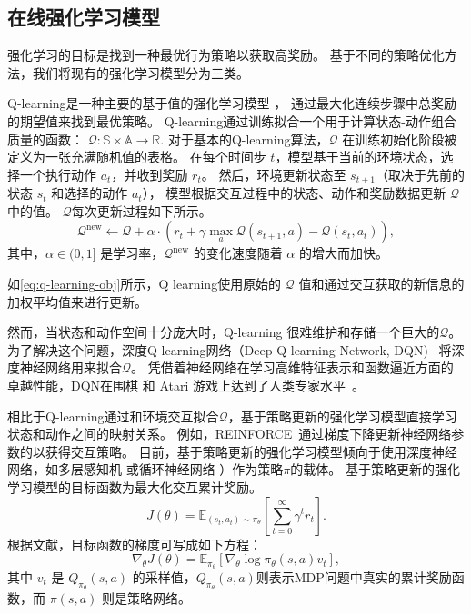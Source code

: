 \subsection{在线强化学习模型}
\label{sec:Deep Reinforcement Learning model}
强化学习的目标是找到一种最优行为策略以获取高奖励。
基于不同的策略优化方法，我们将现有的强化学习模型分为三类。

Q-learning是一种主要的基于值的强化学习模型 \cite{watkins1989learning}，
通过最大化连续步骤中总奖励的期望值来找到最优策略。
Q-learning通过训练拟合一个用于计算状态-动作组合质量的函数：
$
\mathcal{Q}: \mathbb{S} \times \mathbb{A} \rightarrow \mathbb{R}.
$
对于基本的Q-learning算法，$\mathcal{Q}$ 在训练初始化阶段被定义为一张充满随机值的表格。
在每个时间步 $t$，模型基于当前的环境状态，选择一个执行动作 $a_t$，并收到奖励 $r_t$。
然后，环境更新状态至 $s_{t+1}$（取决于先前的状态 $s_t$ 和选择的动作 $a_t$），
模型根据交互过程中的状态、动作和奖励数据更新 $\mathcal{Q}$ 中的值。
$\mathcal{Q}$每次更新过程如下所示。
\begin{equation}
    \label{eq:q-learning-obj}
    \mathcal{Q}^{\text{new}} \leftarrow \mathcal{Q} + 
    \alpha \cdot\left(r_{t}+\gamma \max_{a} \mathcal{Q}\left(s_{t+1}, a\right)-\mathcal{Q}\left(s_{t}, a_{t}\right)\right), 
\end{equation}
其中，$\alpha \in (0,1]$ 是学习率，$\mathcal{Q}^{\text{new}}$ 的变化速度随着 $\alpha$ 的增大而加快。

如\autoref{eq:q-learning-obj}所示，Q learning使用原始的 $\mathcal{Q}$ 值和通过交互获取的新信息的加权平均值来进行更新。

然而，当状态和动作空间十分庞大时，Q-learning 很难维护和存储一个巨大的$\mathcal{Q}$。
为了解决这个问题，深度Q-learning网络（Deep Q-learning Network, DQN)~\cite{MKSGAWR13} 将深度神经网络用来拟合$\mathcal{Q}$。
凭借着神经网络在学习高维特征表示和函数逼近方面的卓越性能，DQN在围棋 \cite{SSSAHGHBLB17} 和 Atari 游戏上达到了人类专家水平~\cite{MKSGAWR13}。

相比于Q-learning通过和环境交互拟合$\mathcal{Q}$，基于策略更新的强化学习模型直接学习状态和动作之间的映射关系。
例如，REINFORCE~\cite{W92}通过梯度下降更新神经网络参数的以获得交互策略。
目前，基于策略更新的强化学习模型倾向于使用深度神经网络，如多层感知机 \cite{XLZP18} 或循环神经网络 \cite{ZMFLA16}）作为策略$\pi$的载体。
基于策略更新的强化学习模型的目标函数为最大化交互累计奖励。
\begin{equation}
    \label{eq:pg-obj}
    J(\theta)=\mathbb{E}_{\left(s_{t}, a_{t}\right) \sim \pi_{\theta}}\left[\sum_{t=0}^{\infty} \gamma^{t} r_{t}\right]. 
\end{equation}
根据文献{\rm\parencite{KT99}}，目标函数的梯度可写成如下方程：
\begin{equation}
    \nabla_{\theta} J(\theta)=\mathbb{E}_{\pi_{\theta}}\left[\nabla_{\theta} \log \pi_{\theta}(s, a) v_t\right], 
\end{equation}
其中 $v_t$ 是 $Q_{\pi_{\theta}}(s,a)$ 的采样值，$Q_{\pi_{\theta}}(s,a)$则表示MDP问题中真实的累计奖励函数，而 $\pi\left(s, a\right)$ 则是策略网络。

